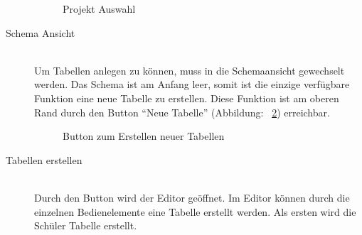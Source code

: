 \begin{description}
\begin{figure}[ht]
        \centering
        \caption{Projekt Auswahl}
        \label{pic:project_select}
\end{figure}


\item[Schema Ansicht] \hfill\\
Um Tabellen anlegen zu können, muss in die Schemaansicht gewechselt werden. Das Schema ist am Anfang leer, somit ist die einzige verfügbare Funktion eine neue Tabelle zu erstellen. Diese Funktion ist am oberen Rand durch den Button ``Neue Tabelle'' (Abbildung: ~\ref{pic:btn_new_table}) erreichbar.

\begin{figure}[ht]
        \centering
        \caption{Button zum Erstellen neuer Tabellen}
        \label{pic:btn_new_table}
\end{figure}

\item[Tabellen erstellen] \hfill\\
Durch den Button wird der Editor geöffnet. Im Editor können durch die einzelnen Bedienelemente eine Tabelle erstellt werden. Als ersten wird die Schüler Tabelle erstellt. \\


\end{description}
